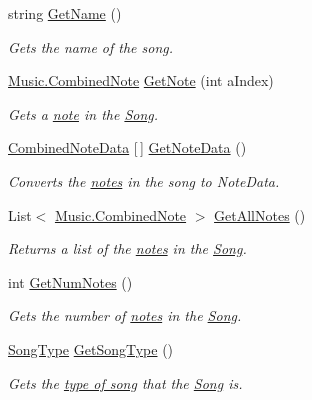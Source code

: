 \begin{DoxyCompactItemize}
string \hyperlink{group___song_pub_func_ga705c433f2bfb5aede337698144b23c8b}{Get\+Name} ()
\begin{DoxyCompactList}\small\item\em Gets the name of the song. \end{DoxyCompactList}\item 
\hyperlink{group___music_structs_struct_music_1_1_combined_note}{Music.\+Combined\+Note} \hyperlink{group___song_pub_func_ga485c83c9278103fed23c532bba1252f0}{Get\+Note} (int a\+Index)
\begin{DoxyCompactList}\small\item\em Gets a \hyperlink{group___music_structs_struct_music_1_1_combined_note}{note} in the \hyperlink{class_song}{Song}. \end{DoxyCompactList}\item 
\hyperlink{group___song_structs_struct_song_1_1_combined_note_data}{Combined\+Note\+Data} \mbox{[}$\,$\mbox{]} \hyperlink{group___song_pub_func_gae3df1fd5448b7d9cefb0fed4af967985}{Get\+Note\+Data} ()
\begin{DoxyCompactList}\small\item\em Converts the \hyperlink{group___music_structs_struct_music_1_1_combined_note}{notes} in the song to Note\+Data. \end{DoxyCompactList}\item 
List$<$ \hyperlink{group___music_structs_struct_music_1_1_combined_note}{Music.\+Combined\+Note} $>$ \hyperlink{group___song_pub_func_ga842675b7691fca074ee394031afc7675}{Get\+All\+Notes} ()
\begin{DoxyCompactList}\small\item\em Returns a list of the \hyperlink{group___music_structs_struct_music_1_1_combined_note}{notes} in the \hyperlink{class_song}{Song}. \end{DoxyCompactList}\item 
int \hyperlink{group___song_pub_func_gad124d0af146885327f8ac455bc013b63}{Get\+Num\+Notes} ()
\begin{DoxyCompactList}\small\item\em Gets the number of \hyperlink{group___music_structs_struct_music_1_1_combined_note}{notes} in the \hyperlink{class_song}{Song}. \end{DoxyCompactList}\item 
\hyperlink{group___song_enums_gae681a1f001333e39fc1cb4fea97bfe1b}{Song\+Type} \hyperlink{group___song_pub_func_gabae5b5d8f727b2d9da7867a99347f86b}{Get\+Song\+Type} ()
\begin{DoxyCompactList}\small\item\em Gets the \hyperlink{group___song_enums_gae681a1f001333e39fc1cb4fea97bfe1b}{type of song} that the \hyperlink{class_song}{Song} is. \end{DoxyCompactList}\item 

\end{DoxyCompactItemize}
